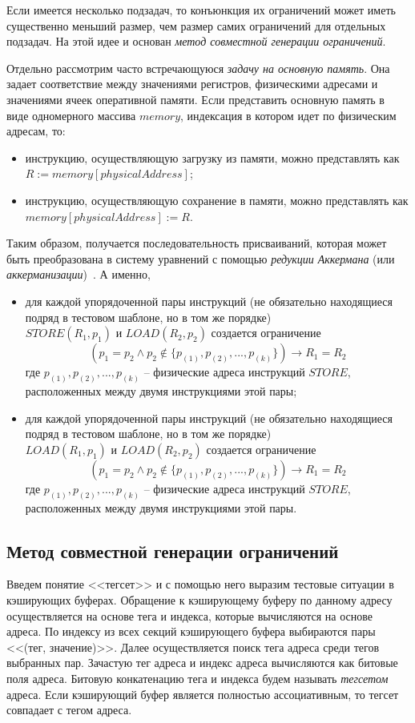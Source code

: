 Если имеется несколько подзадач, то конъюнкция их ограничений может
иметь существенно меньший размер, чем размер самих ограничений для
отдельных подзадач. На этой идее и основан \emph{метод совместной
генерации ограничений}.

Отдельно рассмотрим часто встречающуюся \emph{задачу на основную
память}. Она задает соответствие между значениями регистров,
физическими адресами и значениями ячеек оперативной памяти. Если
представить основную память в виде одномерного массива $memory$,
индексация в котором идет по физическим адресам, то:
\begin{itemize}
\item инструкцию, осуществляющую загрузку из памяти,
можно представлять как $R := memory[physicalAddress]$;
\item инструкцию, осуществляющую сохранение в памяти,
можно представлять как $memory[physicalAddress] := R$.
\end{itemize}
Таким образом, получается последовательность присваиваний, которая
может быть преобразована в систему уравнений с помощью
\emph{редукции Аккермана} (или
\emph{аккерманизации})~\cite{Ackermann}. А именно,
\begin{itemize}
\item для каждой упорядоченной пары инструкций (не обязательно
находящиеся подряд в тестовом шаблоне, но в том же порядке)\\
$STORE(R_1, p_1)$ и $LOAD(R_2, p_2)$ создается ограничение $$ (p_1 =
p_2 \wedge p_2 \notin \{ p_{(1)}, p_{(2)}, ..., p_{(k)}\})
\rightarrow R_1 = R_2$$ где $p_{(1)}, p_{(2)}, ..., p_{(k)}$ --
физические адреса инструкций $STORE$, расположенных между двумя
инструкциями этой пары;
\item для каждой упорядоченной пары инструкций (не обязательно
находящиеся подряд в тестовом шаблоне, но в том же порядке)\\
$LOAD(R_1, p_1)$ и $LOAD(R_2, p_2)$ создается ограничение $$ (p_1 =
p_2 \wedge p_2 \notin \{ p_{(1)}, p_{(2)}, ..., p_{(k)}\})
\rightarrow R_1 = R_2$$ где $p_{(1)}, p_{(2)}, ..., p_{(k)}$ --
физические адреса инструкций $STORE$, расположенных между двумя
инструкциями этой пары.
\end{itemize}

\subsection{Метод совместной генерации ограничений}

Введем понятие <<тегсет>> и с помощью него выразим тестовые ситуации
в кэширующих буферах. Обращение к кэширующему буферу по данному
адресу осуществляется на основе тега и индекса, которые вычисляются
на основе адреса. По индексу из всех секций кэширующего буфера
выбираются пары <<(тег, значение)>>. Далее осуществляется поиск тега
адреса среди тегов выбранных пар. Зачастую тег адреса и индекс
адреса вычисляются как битовые поля адреса. Битовую конкатенацию
тега и индекса будем называть \emph{тегсетом} адреса. Если
кэширующий буфер является полностью ассоциативным, то тегсет
совпадает с тегом адреса.

